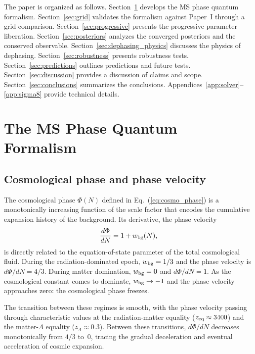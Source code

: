 \documentclass[aps,prd,twocolumn,superscriptaddress,nofootinbib]{revtex4-2}
\begin{document}
The paper is organized as follows. Section~\ref{sec:phase_formalism}
develops the MS phase quantum formalism.
Section~\ref{sec:grid} validates the formalism against Paper~I
through a grid comparison. Section~\ref{sec:progressive} presents
the progressive parameter liberation. Section~\ref{sec:posteriors}
analyzes the converged posteriors and the conserved observable.
Section~\ref{sec:dephasing_physics} discusses the physics of
dephasing. Section~\ref{sec:robustness} presents robustness tests.
Section~\ref{sec:predictions} outlines predictions and future tests.
Section~\ref{sec:discussion} provides a discussion of claims and
scope. Section~\ref{sec:conclusions} summarizes the conclusions.
Appendices~\ref{app:solver}--\ref{app:sigma8} provide technical
details.

\section{The MS Phase Quantum Formalism}
\label{sec:phase_formalism}

\subsection{Cosmological phase and phase velocity}
\label{sec:cosmo_phase}

The cosmological phase $\Phi(N)$ defined in Eq.~(\ref{eq:cosmo_phase})
is a monotonically increasing function of the scale factor that
encodes the cumulative expansion history of the background. Its
derivative, the phase velocity
\begin{equation}
\frac{d\Phi}{dN} = 1 + w_{\rm bg}(N),
\label{eq:phase_velocity}
\end{equation}
is directly related to the equation-of-state parameter of the total
cosmological fluid. During the radiation-dominated epoch,
$w_{\rm bg} = 1/3$ and the phase velocity is $d\Phi/dN = 4/3$. During
matter domination, $w_{\rm bg} = 0$ and $d\Phi/dN = 1$. As the
cosmological constant comes to dominate, $w_{\rm bg} \to -1$ and the
phase velocity approaches zero: the cosmological phase freezes.

The transition between these regimes is smooth, with the phase
velocity passing through characteristic values at the
radiation-matter equality ($z_{\rm eq} \approx 3400$) and the
matter-$\Lambda$ equality ($z_\Lambda \approx 0.3$). Between these
transitions, $d\Phi/dN$ decreases monotonically from $4/3$ to~0,
tracing the gradual deceleration and eventual acceleration of cosmic
expansion.
\end{document}
